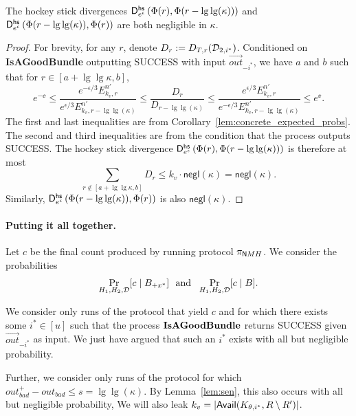 \begin{lemma} \label{lem:hockeyphi}
The hockey stick divergences
$\mathsf{D}^\mathsf{hs}_{e^\epsilon}\left({\Phi(r)}, {\Phi(r-\lg\lg(\kappa))}\right)$ and \\ $\mathsf{D}^\mathsf{hs}_{e^\epsilon}\left({\Phi(r-\lg\lg(\kappa))}, {\Phi(r)}\right)$
are both negligible in $\kappa$.
\end{lemma}

\begin{proof}
For brevity, for any $r$, denote $D_r := D_{T, r}({\cal D}_{2,i^*})$. 
Conditioned on {\bf IsAGoodBundle} outputting SUCCESS with input $\vec{out}_{-{i^*}}$, 
we have $a$ and $b$ such that
for $r \in [a + \lg\lg \kappa, b]$,
\[
e^{-\ee} \le 
\frac{e^{-\epsilon/3}E^{n'}_{k_v, r}}{e^{\epsilon/3}E^{n'}_{k_v, r-\lg\lg(\kappa)}} \le 
\frac{D_r}{D_{r-\lg\lg(\kappa)}} 
\le \frac{e^{\epsilon/3}E^{n'}_{k_v, r}}{e^{-\epsilon/3}E^{n'}_{k_v, r-\lg\lg(\kappa)}} 
\le e^{\ee}. 
\]
%
%
The first and last inequalities are from Corollary~\ref{lem:concrete_expected_probs}. The second and third inequalities are from the condition that the process outputs SUCCESS. 
The hockey stick divergence $\mathsf{D}^\mathsf{hs}_{e^\epsilon}\left({\Phi(r)}, {\Phi(r-\lg\lg(\kappa))}\right)$ is therefore at most
\renewcommand{\negl}{\ensuremath{\mathsf{negl}}} %
\begin{equation*}
\sum_{r \not \in [a+\lg\lg\kappa, b]}  D_r \le k_v \cdot \negl(\kappa) = \negl(\kappa). \tag*{\qedhere}
\end{equation*}
Similarly, $\mathsf{D}^\mathsf{hs}_{e^\epsilon}\left({\Phi(r-\lg\lg(\kappa))}, {\Phi(r)}\right)$ is also $\negl(\kappa)$. 
\end{proof}

\paragraph{Putting it all together.}
Let $c$ be the final count produced by running protocol $\pi_{\mathsf NMH}$.
We consider the probabilities
\[\Pr_{H_1, H_2,\mathcal{D}}[
c \mid B_{+x^*}]
\mbox{~~and~~}
\Pr_{H_1, H_2, \mathcal{D}}[c \mid B]. \]

We consider only runs of the protocol that yield $c$
and for which there exists some
$i^* \in [u]$ such that the process ${\bf IsAGoodBundle}$ returns SUCCESS given $\vec{out}_{-i^*}$ as input. 
We just have argued that such an $i^*$ exists with all but negligible probability.

Further, we consider only runs of the protocol for
which
$out^+_{bad}  - out_{bad} \leq s = \lg\lg(\kappa)$.
By Lemma~\ref{lem:sen}, this also occurs with all but negligible probability,
%
We will also leak $k_v = |\mathsf{Avail}(K_{\theta, i^*}, R \setminus R')|$. 

